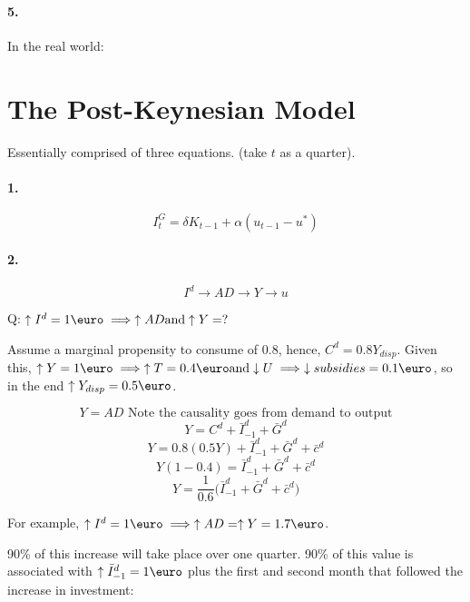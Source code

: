 \documentclass{report}
\begin{document}
\paragraph{5.} In the real world: 


\section{The Post-Keynesian Model}

Essentially comprised of three equations. (take $t$ as a quarter).

\paragraph{1.}

\begin{equation}
    I_t^G=\delta K_{t-1}+\alpha(u_{t-1}-u^*)
\end{equation}

\paragraph{2.}

\begin{equation*}
    I^d \rightarrow AD \rightarrow Y \rightarrow u
\end{equation*}

Q: $\uparrow I^d=1\text{\euro} \implies \uparrow AD \text{and} \uparrow Y=?$

Assume a marginal propensity to consume of $0.8$, hence, $C^d=0.8Y_{disp}$. Given this, $\uparrow Y=1\text{\euro} \implies \uparrow T=0.4\text{\euro} \text{and} \downarrow U \implies \downarrow subsidies=0.1\text{\euro}$, so in the end $\uparrow Y_{disp}=0.5\text{\euro}$. 


\[     Y=AD \text{ Note the causality goes from demand to output} \]
\[     Y=C^d+\bar{I}^d_{-1}+\bar{G}^d                             \]
\[     Y=0.8(0.5Y)+\bar{I}^d_{-1}+\bar{G}^d+\bar{c}^d             \]
\[     Y(1-0.4)=\bar{I}^d_{-1}+\bar{G}^d+\bar{c}^d                \]
\[     Y=\frac{1}{0.6}\bigg(\bar{I}^d_{-1}+\bar{G}^d+\bar{c}^d \bigg)\]

For example, $\uparrow I^d=1\text{\euro} \implies \uparrow AD=\uparrow Y=1.7\text{\euro}$.

90\% of this increase will take place over one quarter. 90\% of this value is associated with $\uparrow \bar{I}^d_{-1}=1\text{\euro}$ plus the first and second month that followed the increase in investment: 
\end{document}
